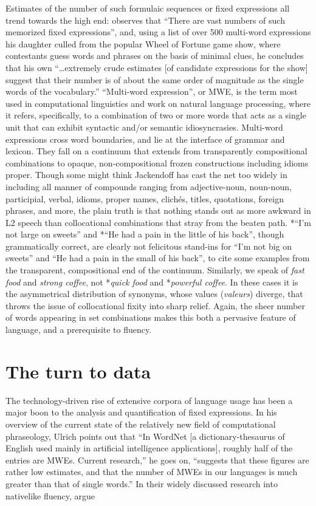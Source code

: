 \documentclass[english,output=paper,colorlinks,citecolor=brown]{../langscibook}
\begin{document}
Estimates of the number of such formulaic sequences or fixed expressions all trend towards the high end: \citet[156]{Jackendoff1997} observes that “There are vast numbers of such memorized fixed expressions”, and, using a list of over 500 multi-word expressions his daughter culled from the popular Wheel of Fortune game show, where contestants guess words and phrases on the basis of minimal clues, he concludes that his own “…extremely crude estimates [of candidate expressions for the show] suggest that their number is of about the same order of magnitude as the single words of the vocabulary.” ``Multi-word expression'', or MWE, is the term most used in computational linguistics and work on natural language processing, where it refers, specifically, to a combination of two or more words that acts as a single unit that can exhibit syntactic and/or semantic idiosyncrasies. Multi-word expressions cross word boundaries, and lie at the interface of grammar and lexicon. They fall on a continuum that extends from transparently compositional combinations to opaque, non-compositional frozen constructions including idioms proper. Though some might think Jackendoff has cast the net too widely in including all manner of compounds ranging from adjective-noun, noun-noun, participial, verbal, idioms, proper names, clichés, titles, quotations, foreign phrases, and more, the plain truth is that nothing stands out as more awkward in L2 speech than collocational combinations that stray from the beaten path. *“I’m not large on sweets” and *“He had a pain in the little of his back”, though grammatically correct, are clearly not felicitous stand-ins for “I’m not big on sweets” and “He had a pain in the small of his back”, to cite some examples from the transparent, compositional end of the continuum. Similarly, we speak of \textit{fast food} and \textit{strong coffee}, not *\textit{quick food} and *\textit{powerful coffee}. In these cases it is the asymmetrical distribution of synonyms, whose values (\textit{valeurs}) diverge, that throws the issue of collocational fixity into sharp relief. Again, the sheer number of words appearing in set combinations makes this both a pervasive feature of language, and a prerequisite to fluency. 

\section{The turn to data}

The technology-driven rise of extensive corpora of language usage has been a major boon to the analysis and quantification of fixed expressions. In his overview of the current state of the relatively new field of computational phraseology, Ulrich \citet[348]{Heid2008} points out that “In WordNet [a dictionary-thesaurus of English used mainly in artificial intelligence applications], roughly half of the entries are MWEs. Current research,” he goes on, “suggests that these figures are rather low estimates, and that the number of MWEs in our languages is much greater than that of single words.” In their widely discussed research into nativelike fluency, \citet[191--192]{PawleySyder1983} argue 
\end{document}

